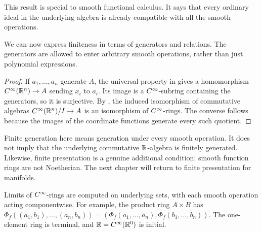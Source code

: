 This result is special to smooth functional calculus. It says that every
ordinary ideal in the underlying algebra is already compatible with all the
smooth operations.

We can now express finiteness in terms of generators and relations.
The generators are allowed to enter arbitrary smooth operations, rather
than just polynomial expressions.



\begin{proof}
  If $a_1,\ldots,a_n$ generate $A$, the universal property in
   gives a homomorphism
  $C^\infty(\mathbb{R}^n)\to A$ sending $x_i$ to $a_i$. Its image is a
  $C^\infty$-subring containing the generators, so it is surjective. By
  , the induced isomorphism of commutative
  algebras $C^\infty(\mathbb{R}^n)/I\to A$ is an isomorphism of $C^\infty$-rings. The
  converse follows because the images of the coordinate functions generate
  every such quotient.
\end{proof}

Finite generation here means generation under every smooth operation. It does
not imply that the underlying commutative $\mathbb{R}$-algebra is finitely generated.
Likewise, finite presentation is a genuine additional condition: smooth
function rings are not Noetherian. The next chapter will return to finite
presentation for manifolds.

Limits of $C^\infty$-rings are computed on underlying sets, with each
smooth operation acting componentwise. For example, the product ring
$A\times B$ has
$\Phi_f((a_1,b_1),\ldots,(a_n,b_n))
=(\Phi_f(a_1,\ldots,a_n),\Phi_f(b_1,\ldots,b_n))$.
The one-element ring is terminal, and $\mathbb{R}=C^\infty(\mathbb{R}^0)$ is initial.

